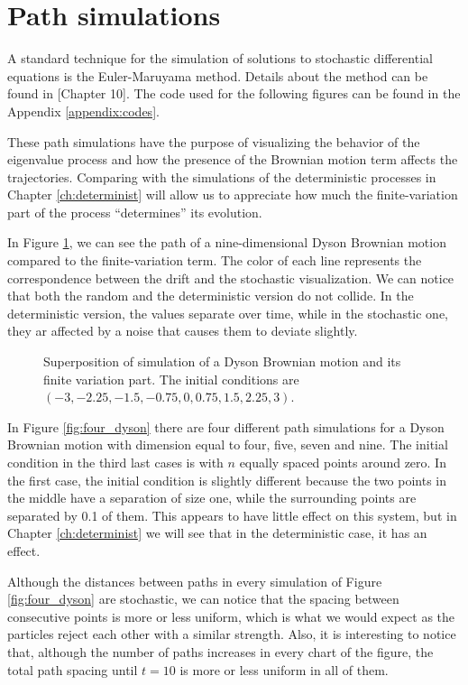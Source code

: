 \section{Path simulations}

A standard technique for the simulation of solutions to stochastic differential equations is the Euler-Maruyama method. Details about the method can be found in \cite{book:asmussen}[Chapter 10]. The code used for the following figures can be found in the Appendix \ref{appendix:codes}. 

These path simulations have the purpose of visualizing the behavior of the eigenvalue process and how the presence of the Brownian motion term affects the trajectories. Comparing with the simulations of the deterministic processes in Chapter \ref{ch:determinist} will allow us to appreciate how much the finite-variation part of the process ``determines'' its evolution.

In Figure \ref{fig:dyson_comparison}, we can see the path of a nine-dimensional Dyson Brownian motion compared to the finite-variation term. The color of each line represents the correspondence between the drift and the stochastic visualization. We can notice that both the random and the deterministic version do not collide. In the deterministic version, the values separate over time, while in the stochastic one, they ar affected by a noise that causes them to deviate slightly.

\begin{figure}[h!] 
    
    \caption{Superposition of simulation of a Dyson Brownian motion and its finite variation part. The initial conditions are $(-3, -2.25, -1.5, -0.75, 0, 0.75, 1.5, 2.25, 3)$.\label{fig:dyson_comparison}}
\end{figure}

In Figure \ref{fig:four_dyson} there are four different path simulations for a Dyson Brownian motion with dimension equal to four, five, seven and nine. The initial condition in the third last cases is with $n$ equally spaced points around zero. In the first case, the initial condition is slightly different because the two points in the middle have a separation of size one, while the surrounding points are separated by 0.1 of them. This appears to have little effect on this system, but in Chapter \ref{ch:determinist} we will see that in the deterministic case, it has an effect.

Although the distances between paths in every simulation of Figure \ref{fig:four_dyson} are stochastic, we can notice that the spacing between consecutive points is more or less uniform, which is what we would expect as the particles reject each other with a similar strength. Also, it is interesting to notice that, although the number of paths increases in every chart of the figure, the total path spacing until $t=10$ is more or less uniform in all of them. 

